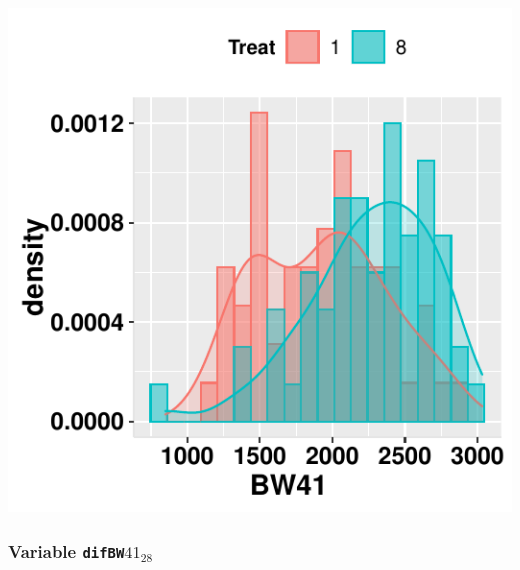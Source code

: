 \documentclass[11pt,a4paper]{article}\usepackage[]{graphicx}\usepackage[]{color}
\makeatletter
\def\maxwidth{ %
  \ifdim\Gin@nat@width>\linewidth
    \linewidth
  \else
    \Gin@nat@width
  \fi
}
\newenvironment{knitrout}{}{} %
\makeatother
\begin{document}
\begin{center}
\begin{knitrout}
\color{fgcolor}
\includegraphics[width=\maxwidth]{figure/unnamed-chunk-11-1} 

\end{knitrout}
\end{center}

\clearpage
\subsubsection{Variable \texttt{difBW$41_{28}$}}
\end{document}
